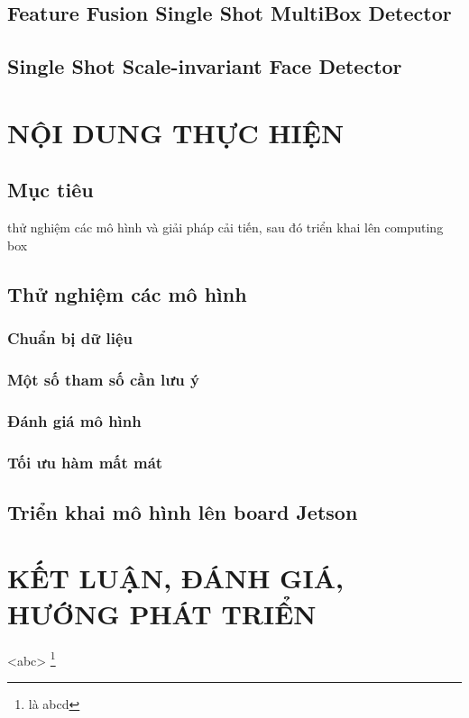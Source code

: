 \documentclass[a4paper]{report}
\begin{document}
\begin{table}[h]
\begin{tabular}{|l|l|l|}
\end{tabular}

\end{table}

\subsubsection{}
\section{Feature Fusion Single Shot MultiBox Detector}
\section{Single Shot Scale-invariant Face Detector }

\chapter{NỘI DUNG THỰC HIỆN}
\section{Mục tiêu} thử nghiệm các mô hình và giải pháp cải tiến, sau đó triển khai lên computing box
\section{Thử nghiệm các mô hình}
\subsection{Chuẩn bị dữ liệu}
\subsection{Một số tham số cần lưu ý}
\subsection{Đánh giá mô hình}
\subsection{Tối ưu hàm mất mát}

\section{Triển khai mô hình lên board Jetson}

\chapter{KẾT LUẬN, ĐÁNH GIÁ, HƯỚNG PHÁT TRIỂN}
<abc>
\footnote{là abcd}
\end{document}
